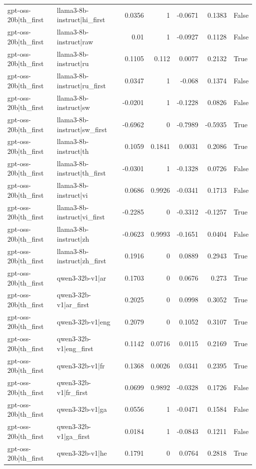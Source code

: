 \begin{table}
\begin{tabular}{l l r r r r l}
gpt-oss-20b|th_first & llama3-8b-instruct|hi_first & 0.0356 & 1 & -0.0671 & 0.1383 & False \\
gpt-oss-20b|th_first & llama3-8b-instruct|raw & 0.01 & 1 & -0.0927 & 0.1128 & False \\
gpt-oss-20b|th_first & llama3-8b-instruct|ru & 0.1105 & 0.112 & 0.0077 & 0.2132 & True \\
gpt-oss-20b|th_first & llama3-8b-instruct|ru_first & 0.0347 & 1 & -0.068 & 0.1374 & False \\
gpt-oss-20b|th_first & llama3-8b-instruct|sw & -0.0201 & 1 & -0.1228 & 0.0826 & False \\
gpt-oss-20b|th_first & llama3-8b-instruct|sw_first & -0.6962 & 0 & -0.7989 & -0.5935 & True \\
gpt-oss-20b|th_first & llama3-8b-instruct|th & 0.1059 & 0.1841 & 0.0031 & 0.2086 & True \\
gpt-oss-20b|th_first & llama3-8b-instruct|th_first & -0.0301 & 1 & -0.1328 & 0.0726 & False \\
gpt-oss-20b|th_first & llama3-8b-instruct|vi & 0.0686 & 0.9926 & -0.0341 & 0.1713 & False \\
gpt-oss-20b|th_first & llama3-8b-instruct|vi_first & -0.2285 & 0 & -0.3312 & -0.1257 & True \\
gpt-oss-20b|th_first & llama3-8b-instruct|zh & -0.0623 & 0.9993 & -0.1651 & 0.0404 & False \\
gpt-oss-20b|th_first & llama3-8b-instruct|zh_first & 0.1916 & 0 & 0.0889 & 0.2943 & True \\
gpt-oss-20b|th_first & qwen3-32b-v1|ar & 0.1703 & 0 & 0.0676 & 0.273 & True \\
gpt-oss-20b|th_first & qwen3-32b-v1|ar_first & 0.2025 & 0 & 0.0998 & 0.3052 & True \\
gpt-oss-20b|th_first & qwen3-32b-v1|eng & 0.2079 & 0 & 0.1052 & 0.3107 & True \\
gpt-oss-20b|th_first & qwen3-32b-v1|eng_first & 0.1142 & 0.0716 & 0.0115 & 0.2169 & True \\
gpt-oss-20b|th_first & qwen3-32b-v1|fr & 0.1368 & 0.0026 & 0.0341 & 0.2395 & True \\
gpt-oss-20b|th_first & qwen3-32b-v1|fr_first & 0.0699 & 0.9892 & -0.0328 & 0.1726 & False \\
gpt-oss-20b|th_first & qwen3-32b-v1|ga & 0.0556 & 1 & -0.0471 & 0.1584 & False \\
gpt-oss-20b|th_first & qwen3-32b-v1|ga_first & 0.0184 & 1 & -0.0843 & 0.1211 & False \\
gpt-oss-20b|th_first & qwen3-32b-v1|he & 0.1791 & 0 & 0.0764 & 0.2818 & True \\

\end{tabular}
\end{table}
